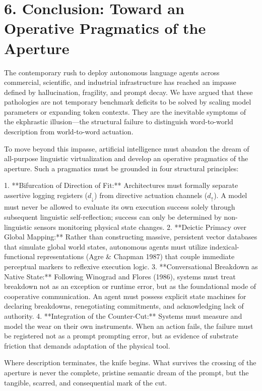 \documentclass[11pt,twocolumn]{article}
\begin{document}
\section*{6. Conclusion: Toward an Operative Pragmatics of the Aperture}
The contemporary rush to deploy autonomous language agents across commercial, scientific, and industrial infrastructure has reached an impasse defined by hallucination, fragility, and prompt decay. We have argued that these pathologies are not temporary benchmark deficits to be solved by scaling model parameters or expanding token contexts. They are the inevitable symptoms of the ekphrastic illusion—the structural failure to distinguish word-to-world description from world-to-word actuation.

To move beyond this impasse, artificial intelligence must abandon the dream of all-purpose linguistic virtualization and develop an operative pragmatics of the aperture. Such a pragmatics must be grounded in four structural principles:

1. **Bifurcation of Direction of Fit:** Architectures must formally separate assertive logging registers ($d_\downarrow$) from directive actuation channels ($d_\uparrow$). A model must never be allowed to evaluate its own execution success solely through subsequent linguistic self-reflection; success can only be determined by non-linguistic sensors monitoring physical state changes.
2. **Deictic Primacy over Global Mapping:** Rather than constructing massive, persistent vector databases that simulate global world states, autonomous agents must utilize indexical-functional representations (Agre & Chapman 1987) that couple immediate perceptual markers to reflexive execution logic.
3. **Conversational Breakdown as Native State:** Following Winograd and Flores (1986), systems must treat breakdown not as an exception or runtime error, but as the foundational mode of cooperative communication. An agent must possess explicit state machines for declaring breakdowns, renegotiating commitments, and acknowledging lack of authority.
4. **Integration of the Counter-Cut:** Systems must measure and model the wear on their own instruments. When an action fails, the failure must be registered not as a prompt prompting error, but as evidence of substrate friction that demands adaptation of the physical tool.

Where description terminates, the knife begins. What survives the crossing of the aperture is never the complete, pristine semantic dream of the prompt, but the tangible, scarred, and consequential mark of the cut.
\end{document}
